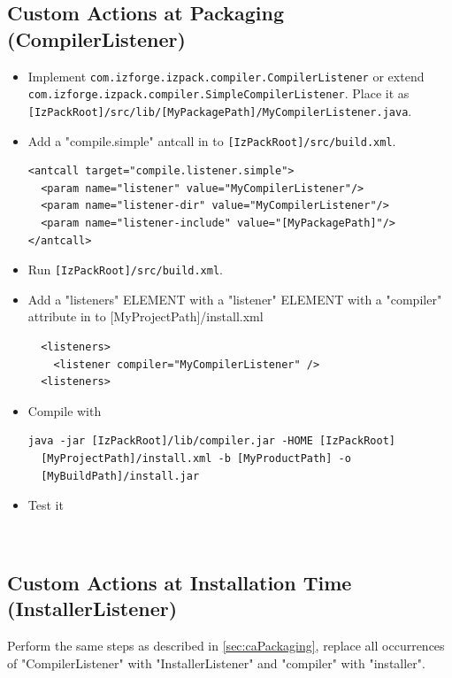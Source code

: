 \subsection{\label{sec:caPackaging}Custom Actions at Packaging (CompilerListener)}

\begin{itemize}
  \item Implement \texttt{com.izforge.izpack.compiler.CompilerListener} or
  extend \texttt{com.izforge.izpack.compiler.SimpleCompilerListener}.
  Place it as \texttt{[IzPackRoot]/src/lib/[MyPackagePath]/MyCompilerListener.java}.

  \item Add a "compile.simple" antcall in to \texttt{[IzPackRoot]/src/build.xml}.
\footnotesize
\begin{verbatim}
<antcall target="compile.listener.simple">
  <param name="listener" value="MyCompilerListener"/>
  <param name="listener-dir" value="MyCompilerListener"/>
  <param name="listener-include" value="[MyPackagePath]"/>
</antcall>
\end{verbatim}
\normalsize

  \item Run \texttt{[IzPackRoot]/src/build.xml}.

  \item Add a "listeners" ELEMENT with a "listener" ELEMENT with
  a "compiler" attribute in to [MyProjectPath]/install.xml
\footnotesize
\begin{verbatim}
  <listeners>
    <listener compiler="MyCompilerListener" />
  <listeners>
\end{verbatim}
\normalsize

  \item Compile with
\footnotesize
\begin{verbatim}
java -jar [IzPackRoot]/lib/compiler.jar -HOME [IzPackRoot]
  [MyProjectPath]/install.xml -b [MyProductPath] -o
  [MyBuildPath]/install.jar
\end{verbatim}
\normalsize

  \item Test it
\end{itemize}\

\subsection{Custom Actions at Installation Time (InstallerListener)}
Perform the same steps as described in \ref{sec:caPackaging}, replace
all occurrences of "CompilerListener" with "InstallerListener" and
"compiler" with "installer".

